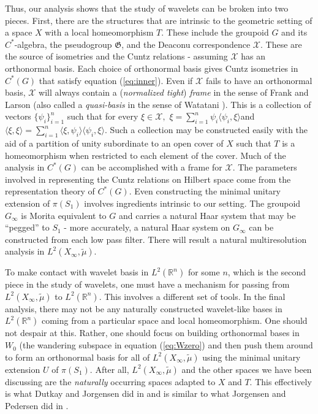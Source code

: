 \documentclass{amsproc}
\theoremstyle{plain}
\theoremstyle{definition}
\theoremstyle{definition}
\theoremstyle{remark}
\theoremstyle{plain}
\begin{document}
Thus, our analysis shows that the study of wavelets can be broken
into two pieces. First, there are the structures that are intrinsic
to the geometric setting of a space $X$ with a local homeomorphism
$T$. These include the groupoid $G$ and its $C^{*}$-algebra, the
pseudogroup $\mathfrak{G}$, and the Deaconu correspondence $\mathcal{X}$.
These are the source of isometries and the Cuntz relations - assuming
$\mathcal{X}$ has an orthonormal basis. Each choice of orthonormal
basis gives Cuntz isometries in $C^{*}(G)$ that satisfy equation
(\ref{eq:inner}). Even if $\mathcal{X}$ fails to have an orthonormal
basis, $\mathcal{X}$ will always contain a (\emph{normalized tight})
\emph{frame} in the sense of Frank and Larson \cite[Definition 3.1]{FL99}
(also called a \emph{quasi-basis} in the sense of Watatani \cite{yW90}).
This is a collection of vectors $\{\psi_{i}\}_{i=1}^{n}$ such that
for every $\xi\in\mathcal{X},$
$\xi=\sum_{i=1}^{n}\psi_{i}\langle\psi_{i},\xi\rangle$and
$\langle\xi,\xi\rangle=\sum_{i=1}^{n}\langle\xi,\psi_{i}\rangle\langle\psi_{i},
\xi\rangle$.
Such a collection may be constructed easily with the aid of a partition
of unity subordinate to an open cover of $X$ such that $T$ is a
homeomorphism when restricted to each element of the cover. Much of
the analysis in $C^{*}(G)$ can be accomplished with a frame for $\mathcal{X}$.
The parameters involved in representing the Cuntz relations on Hilbert
space come from the representation theory of $C^{*}(G)$. Even constructing
the minimal unitary extension of $\pi(S_{1})$ involves ingredients
intrinsic to our setting. The groupoid $G_{\infty}$ is Morita equivalent
to $G$ and carries a natural Haar system that may be ``pegged'' to
$S_{1}$ - more accurately, a natural Haar system on $G_{\infty}$
can be constructed from each low pass filter. There will result a
natural multiresolution analysis in $L^{2}(X_{\infty},\tilde{\mu})$. 

To make contact with wavelet basis in $L^{2}(\mathbb{R}^{n})$ for
some $n$, which is the second piece in the study of wavelets, one
must have a mechanism for passing from $L^{2}(X_{\infty},\tilde{\mu})$
to $L^{2}(\mathbb{R}^{n})$. This involves a different set of tools.
In the final analysis, there may not be any naturally constructed
wavelet-like bases in $L^{2}(\mathbb{R}^{n})$ coming from a particular
space and local homeomorphism. One should not despair at this. Rather,
one should focus on building orthonormal bases in $W_{0}$ (the wandering
subspace in equation (\ref{eq:Wzero}) and then push them around to
form an orthonormal basis for all of $L^{2}(X_{\infty},\tilde{\mu})$
using the minimal unitary extension $U$ of $\pi(S_{1})$. After all,
$L^{2}(X_{\infty},\tilde{\mu})$ and the other spaces we have been
discussing are the \emph{naturally} occurring spaces adapted to $X$
and $T$. This effectively is what Dutkay and Jorgensen did in \cite{DJ05a}
and is similar to what Jorgensen and Pedersen did in \cite{JP98}.
\end{document}
